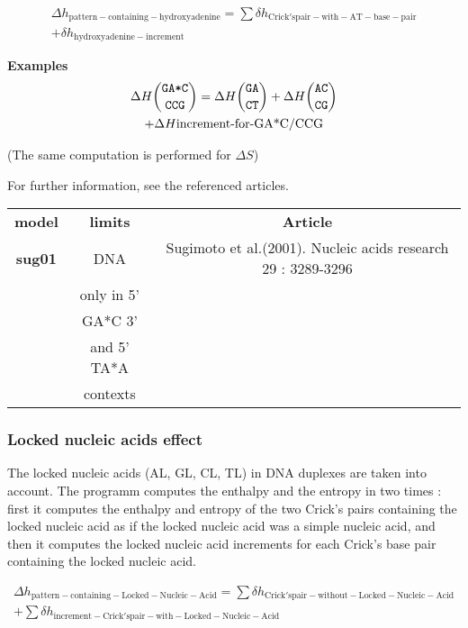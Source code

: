 \documentclass{article}
\begin{document}
\begin{multline*}
\Delta{}h_\mathrm{pattern-containing-hydroxyadenine} =
\sum \delta{}h_\mathrm{Crick's pair-with-AT-base-pair} \\ +
\delta{}h_\mathrm{hydroxyadenine-increment}
\end{multline*}

\textbf{Examples}
\begin{multline*}
\Delta H {\mbox{\texttt{GA*C}} \choose \mbox{\texttt{CCG}}} = 
\Delta H {\mbox{\texttt{GA}} \choose \mbox{\texttt{CT}}} +
\Delta H {\mbox{\texttt{AC}} \choose \mbox{\texttt{CG}}} \\ +
\Delta H {\mbox{increment-for-GA*C/CCG}}\\
\end{multline*}

       (The same computation is performed for $\Delta S$) 
       
For further information, see the referenced articles.

\begin{table}[h]
\begin{tabular}[h]{| c | c | c |}
\textbf{model} & \textbf{limits} & \textbf{Article} \\
\textbf{sug01} & DNA & Sugimoto et al.(2001). Nucleic acids research 29 : 3289-3296\\
 & only in 5' & \\
 & GA*C 3' & \\
 & and 5' TA*A & \\
 & contexts & \\
\end{tabular}
\end{table}

\subsubsection{Locked nucleic acids effect}

The locked nucleic acids (AL, GL, CL, TL) in DNA duplexes are taken into account.
The programm computes the enthalpy and the entropy in two times : first it computes the enthalpy and entropy of 
the two Crick's pairs containing the locked nucleic acid as if the locked nucleic acid was a simple nucleic acid,
and then it computes the locked nucleic acid increments for each Crick's base pair containing the locked nucleic acid.

\begin{multline*}
\Delta{}h_\mathrm{pattern-containing-Locked-Nucleic-Acid} =
\sum \delta{}h_\mathrm{Crick's pair-without-Locked-Nucleic-Acid} \\ +
\sum \delta{}h_\mathrm{increment-Crick's pair-with-Locked-Nucleic-Acid}
\end{multline*}
\end{document}
